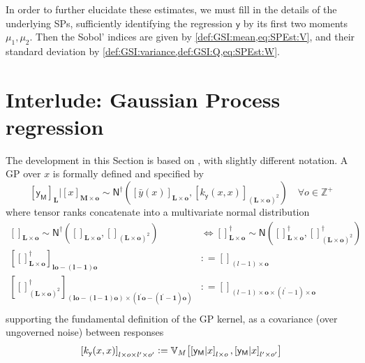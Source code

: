 \documentclass[preprint,12pt]{elsarticle}
\newcommand*{\M}[1]{\ensuremath{#1}\xspace}
\newcommand*{\x}{\times}
\newcommand*{\mi}[1]{\mathbf{#1}}
\newcommand*{\st}[1]{\mathbb{#1}}
\newcommand*{\rv}[1]{\mathsf{#1}}
\newcommand*{\te}[2][]{\left\lbrack{#2}\right\rbrack_{#1}}
\newcommand*{\deq}{\M{\mathrel{\mathop:}=}}
\newcommand*{\cov}[3][]{\ifthenelse{\equal{#1}{}}{\mathbb{V}_{#3}\!\left\lbrack{#2}\right\rbrack}{\mathbb{V}_{#3}\!\left\lbrack{#2,#1}\right\rbrack}}
\newcommand*{\gauss}[2]{\mathsf{N}\!\left({#1,#2}\right)}
\newcommand*{\gaussd}[2]{\mathsf{N}^{\dagger}\!\left({#1,#2}\right)}
\begin{document}
    In order to further elucidate these estimates, we must fill in the details of the underlying SPs, sufficiently identifying the regression $\rv{y}$ by its first two moments $\mu_{1}, \mu_{2}$. Then the Sobol' indices are given by \cref{def:GSI:mean,eq:SPEst:V}, and their standard deviation by \cref{def:GSI:variance,def:GSI:Q,eq:SPEst:W}.


\section{Interlude: Gaussian Process regression} \label{sec:GPR}
    The development in this Section is based on \cite{Alvarez.etal2011}, with slightly different notation. A GP over $x$ is formally defined and specified by
    \begin{equation*}
        \te[\mi{L}]{\rv{y_M}} \big\vert \te[\mi{M}\x\mi{o}]{x} \sim 
        \gaussd{\te[\mi{L}\x\mi{o}]{\bar{y}(x)}}{\te[(\mi{L}\x\mi{o})^{2}]
        {k_{\rv{y}}(x,x)}} \quad \forall o \in \st{Z^{+}}
    \end{equation*}
    where tensor ranks concatenate into a multivariate normal distribution
    \begin{equation*}
        \begin{aligned}
            \te[\mi{L}\x\mi{o}]{} \sim \gaussd{\te[\mi{L}\x\mi{o}]{}}{\te[(\mi{L\x o})^{2}]{}}
            & \Longleftrightarrow
            \te[\mi{L}\x\mi{o}]{}^{\dagger} \sim \gauss{\te[\mi{L}\x\mi{o}]{}^{\dagger}}{\te[(\mi{L\x o})^{2}]{}^{\dagger}} \\
            \te[\mi{lo}-\mi{(l-1)o}]{\te[\mi{L}\x\mi{o}]{}^{\dagger}} 
            &\deq \te[(l-1)\x\mi{o}]{} \\
            \te[(\mi{lo}-(\mi{l-1})\mi{o}) \x (\mi{l^{\prime}o}-\mi{(l^{\prime}-1)o})]
            {\te[(\mi{L\x o})^{2}]{}^{\dagger}} 
            &\deq \te[(l-1)\x\mi{o} \x (l^{\prime}-1)\x\mi{o}]{} \\
        \end{aligned}
    \end{equation*}
    supporting the fundamental definition of the GP kernel, as a covariance (over ungoverned noise) between responses
    \begin{equation*}
        \te[l\x o\x l^{\prime}\x o^{\prime}]{k_{\rv{y}}(x,x)} 
        \deq \cov[{\te[l^{\prime}\x o^{\prime}]{\rv{y_M}\vert x}}]{\te[l\x o]{\rv{y_M}\vert x}}{M}
    \end{equation*}
\end{document}
